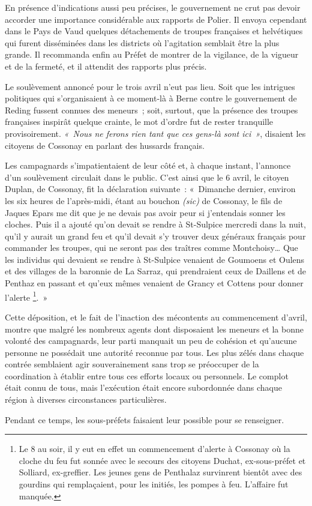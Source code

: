 \documentclass[french,twoside]{book} %
\begin{document}
En présence d’indications aussi peu précises, le gouvernement ne crut pas devoir accorder une importance considérable aux rapports de Polier. Il envoya cependant dans le Pays de Vaud quelques détachements de troupes françaises et helvétiques qui furent disséminées dans les districts où l’agitation semblait être la plus grande. Il recommanda enfin au Préfet de montrer de la vigilance, de la vigueur et de la fermeté, et il attendit des rapports plus précis.\par
Le soulèvement annoncé pour le trois avril n’eut pas lieu. Soit que les intrigues politiques qui s’organisaient à ce moment-là à Berne contre le gouvernement de Reding fussent connues des meneurs ; soit, surtout, que la présence des troupes françaises inspirât quelque crainte, le mot d’ordre fut de rester tranquille provisoirement. \emph{« Nous ne ferons rien tant que ces gens-là sont ici »}, disaient les citoyens de Cossonay en parlant des hussards français.\par
Les campagnards s’impatientaient de leur côté et, à chaque instant, l’annonce d’un soulèvement circulait dans le public. C’est ainsi que le 6 avril, le citoyen Duplan, de Cossonay, fit la déclaration suivante : « Dimanche dernier, environ les six heures de l’après-midi, étant au bouchon \emph{(sic)} de Cossonay, le fils de Jaques Epars me dit que je ne devais pas avoir peur si j’entendais sonner les cloches. Puis il a ajouté qu’on devait se rendre à St-Sulpice mercredi dans la nuit, qu’il y aurait un grand feu et qu’il devait s’y trouver deux généraux français pour commander les troupes, qui ne seront pas des traîtres comme Montchoisy… Que les individus qui devaient se rendre à St-Sulpice venaient de Goumoens et Oulens et des villages de la baronnie de La Sarraz, qui prendraient ceux de Daillens et de Penthaz en passant et qu’eux mêmes venaient de Grancy et Cottens pour donner l’alerte \footnote{Le 8 au soir, il y eut en effet un commencement d’alerte à Cossonay où la cloche du feu fut sonnée avec le secours des citoyens Duchat, ex-sous-préfet et Solliard, ex-greffier. Les jeunes gens de Penthalaz survinrent bientôt avec des gourdins qui remplaçaient, pour les initiés, les pompes à feu. L’affaire fut manquée.}. »\par
Cette déposition, et le fait de l’inaction des mécontents au commencement d’avril, montre que malgré les nombreux agents dont disposaient les meneurs et la bonne volonté des campagnards, leur parti manquait un peu de cohésion et qu’aucune personne ne possédait une autorité reconnue par tous. Les plus zélés dans chaque contrée semblaient agir souverainement sans trop se préoccuper de la coordination à établir entre tous ces efforts locaux ou personnels. Le complot était connu de tous, mais l’exécution était encore subordonnée dans chaque région à diverses circonstances particulières.\par
Pendant ce temps, les sous-préfets faisaient leur possible pour se renseigner.\par
\end{document}
